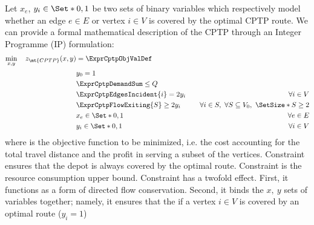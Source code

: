 Let $x_{e}$, $y_{i} \in \Set*{0, 1}$ be two sets of binary variables which respectively
model whether an edge $e \in E$ or vertex $i \in V$ is covered by the optimal CPTP route.
We can provide a formal mathematical description of the CPTP through an Integer Programme (IP) formulation:
\begin{align}
	\min_{x,y} \quad z_\mt{CPTP}(x, y) & = \ExprCptpObjValDef \label{eq:cptp-obj-function}                                                                                                         \\
	                                   & y_0 = 1                                           & \label{eq:cptp-depot-part-of-tour-constraint}                                                         \\
	                                   & \ExprCptpDemandSum  \le Q                         & \label{eq:cptp-resource-upper-bound-constraint}                                                       \\
	                                   & \ExprCptpEdgesIncident{i}  = 2 y_i                & \quad \forall i \in V         \label{eq:cptp-flow-conservation-constraint}                            \\
	                                   & \ExprCptpFlowExiting{S} \ge 2 y_{i}               & \quad \forall i \in S,\ \forall S \subseteq V_0,\ \SetSize*{S} \ge 2 \label{eq:cptp-gsec-constraints} \\
	                                   & x_{e}                   \in \Set*{0, 1}           & \quad \forall e \in E               \label{eq:cptp-x-mip-var-bounds}                                  \\
	                                   & y_{i}                    \in \Set*{0, 1}          & \quad \forall i \in V             \label{eq:cptp-y-mip-var-bounds}
\end{align}
where  is the objective function to be minimized, i.e. the cost
accounting for the total travel distance and the profit in serving a subset of the vertices.
Constraint  ensures that the depot is always covered by the optimal route.
Constraint  is the resource consumption upper bound.
Constraint  has a twofold effect.
First, it functions as a form of directed flow conservation.
Second, it binds the $x,\ y$ sets of variables together;
namely, it ensures that the if a vertex $i \in V$ is covered by an optimal route ($y_i = 1$)
